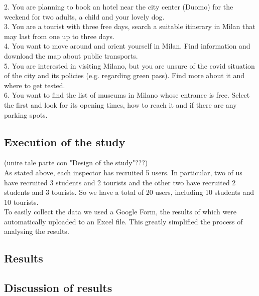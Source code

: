     2. You are planning to book an hotel near the city center (Duomo) for the weekend for two adults, a child and your lovely dog.\\
    3. You are a tourist with three free days, search a suitable itinerary in Milan that may last from one up to three days.\\
    4. You want to move around and orient yourself in Milan. Find information and download the map about public transports.\\
    5. You are interested in visiting Milano, but you are unsure of the covid situation of the city and its policies (e.g. regarding green pass). Find more about it and where to get tested.\\
    6. You want to find the list of museums in Milano whose entrance is free. Select the first and look for its opening times, how to reach it and if there are any parking spots.\\
    
\subsection{Execution of the study}
    (unire tale parte con "Design of the study"???)\\
    As stated above, each inspector has recruited 5 users. In particular, two of us have recruited 3 students and 2 tourists and the other two have recruited 2 students and 3 tourists. So we have a total of 20 users, including 10 students and 10 tourists.\\
    To easily collect the data we used a Google Form, the results of which were automatically uploaded to an Excel file. This greatly simplified the process of analysing the results.

\subsection{Results}

\subsection{Discussion of results}
